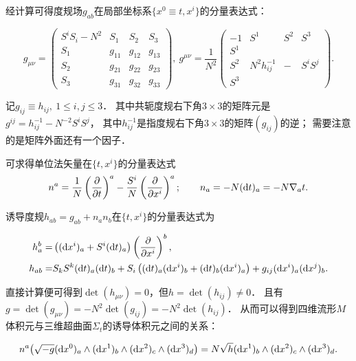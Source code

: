 经计算可得度规场$g_{ab}$在局部坐标系$\{x^0\equiv t,x^i \}$的分量表达式：
\begin{small}
\begin{equation}\label{chsm:eqn_ADM-metric}
    g_{\mu\nu}=\begin{pmatrix}
        S^i S_i -N^2 & S_1 & S_2 &S_3 \\
        S_1 &g_{11} & g_{12} & g_{13} \\
        S_2 &g_{21} & g_{22} & g_{23} \\
        S_3 &g_{31} & g_{32} & g_{33}
    \end{pmatrix}, \
    g^{\mu\nu}=\frac{1}{N^{2}} \begin{pmatrix}
        -1 & S^1 & S^2 & S^3 \\
        S^1 & &  &  \\
        S^2 &N^{2} h_{ij}^{-1} & - & S^i S^j \\
        S^3 & &  &
    \end{pmatrix} .
\end{equation}
\end{small}
记$g_{ij}\equiv h_{ij},\ 1\leqslant i,j \leqslant 3$．
其中共轭度规右下角$3\times 3$的矩阵元是$g^{ij}= h_{ij}^{-1}-N^{-2}S^i S^j$，
其中$h_{ij}^{-1}$是指度规右下角$3\times 3$的矩阵$(g_{ij})$的逆；
需要注意的是矩阵外面还有一个因子．

可求得单位法矢量在$\{t,x^i\}$的分量表达式
\begin{equation}\label{chsm:eqn_ADM-n}
    n^a = \frac{1}{N} \left(\frac{\partial }{\partial t}\right)^a
    -\frac{S^i}{N} \left(\frac{\partial }{\partial x^i}\right)^a  ;\qquad
    n_a = -N ({\rm d}t)_a = -N \nabla_a t .
\end{equation}


诱导度规$h_{ab}=g_{ab}+n_a n_b$在$\{t,x^i\}$的分量表达式为
\begin{small}
\begin{subequations}\label{chsm:eqn_ADM-hab}
\begin{align}
    h_a^b =& \left( ({\rm d}x^i)_a +S^i ({\rm d}t)_a \right) 
    \left(\frac{\partial }{\partial x^i}\right)^b , \label{chsm:eqn_ADM-hab-1}\\
    h_{ab}=& S_k S^k ({\rm d}t)_a ({\rm d}t)_b + S_i\left( ({\rm d}t)_a ({\rm d}x^i)_b
    + ({\rm d}t)_b ({\rm d}x^i)_a \right) + g_{ij} ({\rm d}x^i)_a ({\rm d}x^j)_b .
    \label{chsm:eqn_ADM-hab-2} 
\end{align}
\end{subequations}
\end{small}
直接计算便可得到$\det(h_{\mu\nu})=0$，但$h=\det(h_{ij})\neq 0$．
且有$g=\det(g_{\mu\nu})=-N^2 \det(g_{ij})=-N^2 \det(h_{ij})$．
从而可以得到四维流形$M$体积元与三维超曲面$\Sigma_t$的诱导体积元之间的关系：
\begin{small}
\begin{equation}
   n^a \bigl(\sqrt{-g}({\rm d}x^0)_a \wedge ({\rm d}x^1)_b \wedge({\rm d}x^2)_c \wedge({\rm d}x^3)_d \bigr) 
        = N \sqrt{h} ({\rm d}x^1)_b \wedge({\rm d}x^2)_c \wedge({\rm d}x^3)_d  .
\end{equation}
\end{small}

